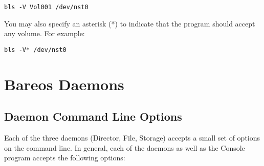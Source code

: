 \footnotesize
\begin{verbatim}
bls -V Vol001 /dev/nst0
\end{verbatim}
\normalsize

You may also specify an asterisk (*) to indicate that the program should
accept any volume. For example:

\footnotesize
\begin{verbatim}
bls -V* /dev/nst0
\end{verbatim}
\normalsize


\section{Bareos Daemons}

\subsection{Daemon Command Line Options}
\label{daemon-command-line-options}

Each of the three daemons (Director, File, Storage) accepts a small set of
options on the command line. In general, each of the daemons as well as the
Console program accepts the following options:

